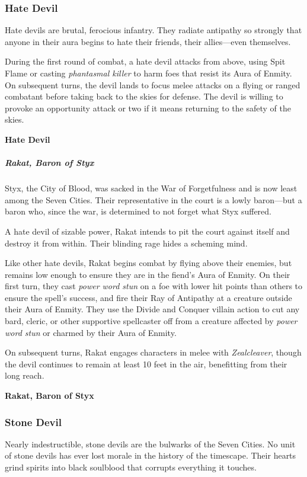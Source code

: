 \documentclass[10pt,a4paper,twoside,bg=print,twocolumn,openany,nodeprecatedcode]{dndbook}
\begin{document}
\subsubsection{Hate Devil}
Hate devils are brutal, ferocious infantry. They radiate antipathy so strongly that anyone in their aura begins to hate their friends, their allies—even themselves.

During the first round of combat, a hate devil attacks from above, using Spit Flame or casting \textit{phantasmal killer} to harm foes that resist its Aura of Enmity. On subsequent turns, the devil lands to focus melee attacks on a flying or ranged combatant before taking back to the skies for defense. The devil is willing to provoke an opportunity attack or two if it means returning to the safety of the skies.

\textbf{Hate Devil}

\subparagraph{Rakat, Baron of Styx}
Styx, the City of Blood, was sacked in the War of Forgetfulness and is now least among the Seven Cities. Their representative in the court is a lowly baron—but a baron who, since the war, is determined to not forget what Styx suffered.

A hate devil of sizable power, Rakat intends to pit the court against itself and destroy it from within. Their blinding rage hides a scheming mind.

Like other hate devils, Rakat begins combat by flying above their enemies, but remains low enough to ensure they are in the fiend's Aura of Enmity. On their first turn, they cast \textit{power word stun} on a foe with lower hit points than others to ensure the spell's success, and fire their Ray of Antipathy at a creature outside their Aura of Enmity. They use the Divide and Conquer villain action to cut any bard, cleric, or other supportive spellcaster off from a creature affected by \textit{power word stun} or charmed by their Aura of Enmity.

On subsequent turns, Rakat engages characters in melee with \textit{Zealcleaver}, though the devil continues to remain at least 10 feet in the air, benefitting from their long reach.

\textbf{Rakat, Baron of Styx}

\subsubsection{Stone Devil}
Nearly indestructible, stone devils are the bulwarks of the Seven Cities. No unit of stone devils has ever lost morale in the history of the timescape. Their hearts grind spirits into black soulblood that corrupts everything it touches.
\end{document}

